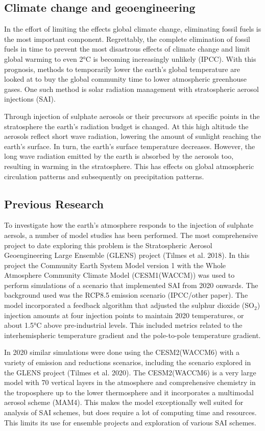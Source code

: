 \subsection{Climate change and geoengineering}
In the effort of limiting the effects global climate change, eliminating fossil fuels is the most important component. Regrettably, the complete elimination of fossil fuels in time to prevent the most disastrous effects of climate change and limit global warming to even 2°C is becoming increasingly unlikely (IPCC). With this prognosis, methods to temporarily lower the earth's global temperature are looked at to buy the global community time to lower atmospheric greenhouse gases. One such method is solar radiation management with stratospheric aerosol injections (SAI). 

Through injection of sulphate aerosols or their precursors at specific points in the stratosphere the earth's radiation budget is changed. At this high altitude the aerosols reflect short wave radiation, lowering the amount of sunlight reaching the earth's surface. In turn, the earth's surface temperature decreases. However, the long wave radiation emitted by the earth is absorbed by the aerosols too, resulting in warming in the stratosphere. This has effects on global atmospheric circulation patterns and subsequently on precipitation patterns. 

\subsection{Previous Research}
To investigate how the earth's atmosphere responds to the injection of sulphate aersols, a number of model studies has been performed. The most comprehensive project to date exploring this problem is the Stratospheric Aerosol Geoengineering Large Ensemble (GLENS) project (Tilmes et al. 2018). In this project the Community Earth System Model version 1 with the Whole Atmosphere Community Climate Model (CESM1(WACCM)) was used to perform simulations of a scenario that implemented SAI from 2020 onwards. The background used was the RCP8.5 emission scenario (IPCC/other paper). The model incorporated a feedback algorithm that adjusted the sulphur dioxide (SO$_2$) injection amounts at four injection points to maintain 2020 temperatures, or about 1.5°C  above pre-industrial levels. This included metrics related to the interhemispheric temperature gradient and the pole-to-pole temperature gradient. 

In 2020 similar simulations were done using the CESM2(WACCM6) with a variety of emission and reductions scenarios, including the scenario explored in the GLENS project (Tilmes et al. 2020). The CESM2(WACCM6) is a very large model with 70 vertical layers in the atmosphere and comprehensive chemistry in the troposphere up to the lower thermosphere and it incorporates a multimodal aerosol scheme (MAM4). This makes the model exceptionally well suited for analysis of SAI schemes, but does require a lot of computing time and resources. This limits its use for ensemble projects and exploration of various SAI schemes. 


